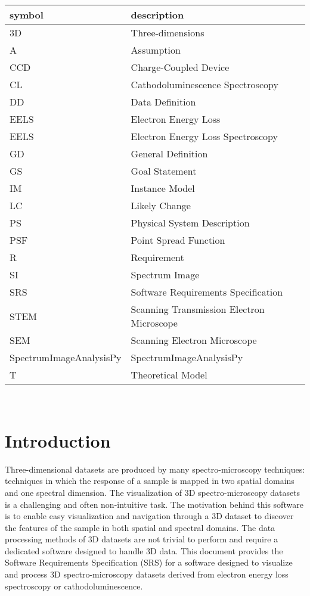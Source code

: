 \documentclass[12pt]{article}
\newcommand{\progname}{SpectrumImageAnalysisPy} %
\begin{document}
\renewcommand{\arraystretch}{1.2}
\begin{tabular}{l l} 
  \toprule		
  \textbf{symbol} & \textbf{description}\\
  \midrule 
  3D & Three-dimensions\\
  A & Assumption\\
  CCD & Charge-Coupled Device\\
  CL & Cathodoluminescence Spectroscopy\\
  DD & Data Definition\\
  EELS & Electron Energy Loss\\
  EELS & Electron Energy Loss Spectroscopy\\
  GD & General Definition\\
  GS & Goal Statement\\
  IM & Instance Model\\
  LC & Likely Change\\
  PS & Physical System Description\\
  PSF & Point Spread Function\\
  R & Requirement\\
  SI & Spectrum Image\\
  SRS & Software Requirements Specification\\
  STEM & Scanning Transmission Electron Microscope\\
  SEM & Scanning Electron Microscope\\
  \progname{} & SpectrumImageAnalysisPy\\
  T & Theoretical Model\\
  \bottomrule
\end{tabular}\\

\newpage
{}

\section{Introduction}
Three-dimensional datasets are produced by many spectro-microscopy techniques: techniques in which the response of a sample is mapped in two spatial domains and one spectral dimension. The visualization of 3D spectro-microscopy datasets is a challenging and often non-intuitive task. The motivation behind this software is to enable easy visualization and navigation through a 3D dataset to discover the features of the sample in both spatial and spectral domains. The data processing methods of 3D datasets are not trivial to perform and require a dedicated software designed to handle 3D data. This document provides the Software Requirements Specification (SRS) for a software designed to visualize and process 3D spectro-microscopy datasets derived from electron energy loss spectroscopy or cathodoluminescence.
\end{document}
